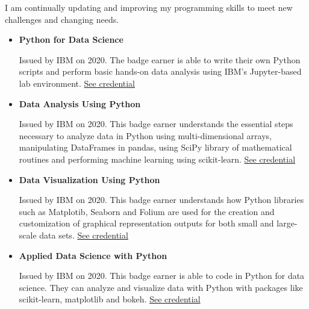 \documentclass[letterpaper, 11pt]{article}[leftmargin=*]
\newcommand{\resumeItemListStart}{\begin{itemize}[leftmargin=4.5mm]\itemsep-3pt}
\newcommand{\resumeItemListEnd}{\end{itemize}}
\newcommand{\resumeItem}[1]{
  \item\small{
    {#1}
  }
}
\begin{document}
\vspace{0.2cm}
{\footnotesize I am continually updating and improving my programming skills to meet new challenges and changing needs.}
\vspace{-0.1cm}
\resumeItemListStart
\resumeItem{\textbf{Python for Data Science}\par
\vspace{-0.15cm}
{\footnotesize Issued by IBM on 2020. The badge earner is able to write their own Python scripts and perform basic hands-on data analysis using IBM's Jupyter-based lab environment. \href{https://www.youracclaim.com/badges/0f8785bb-1050-4da5-8dd3-15d8bf1d68a8}{See credential \faExternalLink}}}
\vspace{0.1cm}
\resumeItem{\textbf{Data Analysis Using Python}\par
\vspace{-0.15cm}
{\footnotesize Issued by IBM on 2020. This badge earner understands the essential steps necessary to analyze data in Python using multi-dimensional arrays, manipulating DataFrames in pandas, using SciPy library of mathematical routines and performing machine learning using scikit-learn. \href{https://www.youracclaim.com/badges/6254609b-3350-47b3-83e9-d7e6ff2a1daa}{See credential \faExternalLink}}}
\vspace{0.1cm}
\resumeItem{\textbf{Data Visualization Using Python}\par
\vspace{-0.15cm}
{\footnotesize Issued by IBM on 2020. This badge earner understands how Python libraries such as Matplotib, Seaborn and Folium are used for the creation and customization of graphical representation outputs for both small and large-scale data sets. \href{https://www.youracclaim.com/badges/6e5beb76-93e0-4f62-9a4d-6de24671215f}{See credential \faExternalLink}}}
\vspace{0.1cm}
\resumeItem{\textbf{Applied Data Science with Python}\par
\vspace{-0.15cm}
{\footnotesize Issued by IBM on 2020. This badge earner is able to code in Python for data science. They can analyze and visualize data with Python with packages like scikit-learn, matplotlib and bokeh. \href{https://www.youracclaim.com/badges/fb8ee1fc-0a04-4027-ad0e-21179858d327}{See credential \faExternalLink}}}
\resumeItemListEnd

\end{document}
